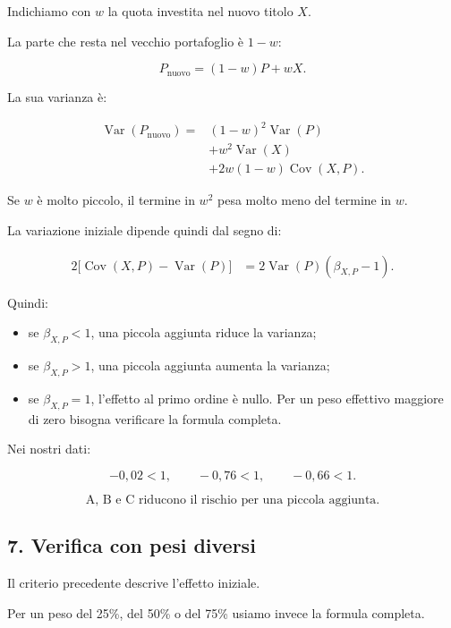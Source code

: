 \noindent Indichiamo con $w$
la quota investita nel nuovo titolo $X$.

\noindent La parte che resta
nel vecchio portafoglio è $1-w$:

\[
P_{\text{nuovo}}=(1-w)P+wX.
\]

\noindent La sua varianza è:

\[
\boxed{
\begin{aligned}
\operatorname{Var}(P_{\text{nuovo}})
={}&(1-w)^2\operatorname{Var}(P)\\
&+w^2\operatorname{Var}(X)\\
&+2w(1-w)\operatorname{Cov}(X,P).
\end{aligned}
}
\]

\noindent Se $w$ è molto piccolo,
il termine in $w^2$
pesa molto meno del termine in $w$.

\noindent La variazione iniziale
dipende quindi dal segno di:

\[
\begin{aligned}
2\bigl[
\operatorname{Cov}(X,P)-\operatorname{Var}(P)
\bigr]
&=
2\operatorname{Var}(P)(\beta_{X,P}-1).
\end{aligned}
\]

\noindent Quindi:

\begin{itemize}
    \item se $\beta_{X,P}<1$,
    una piccola aggiunta riduce la varianza;

    \item se $\beta_{X,P}>1$,
    una piccola aggiunta aumenta la varianza;

    \item se $\beta_{X,P}=1$,
    l'effetto al primo ordine è nullo.
    Per un peso effettivo maggiore di zero
    bisogna verificare la formula completa.
\end{itemize}

\noindent Nei nostri dati:

\[
-0{,}02<1,
\qquad
-0{,}76<1,
\qquad
-0{,}66<1.
\]

\[
\boxed{
\text{A, B e C riducono il rischio
per una piccola aggiunta.}
}
\]


\subsection*{7. Verifica con pesi diversi}

\noindent Il criterio precedente
descrive l'effetto iniziale.

\noindent Per un peso del 25\%, del 50\%
o del 75\% usiamo invece
la formula completa.

